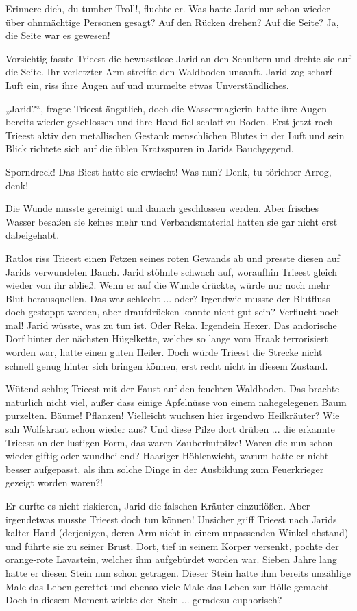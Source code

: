 Erinnere dich, du tumber Troll!, fluchte er. Was hatte Jarid nur schon wieder über ohnmächtige Personen gesagt? Auf den Rücken drehen? Auf die Seite? Ja, die Seite war es gewesen!

Vorsichtig fasste Trieest die bewusstlose Jarid an den Schultern und drehte sie auf die Seite. Ihr verletzter Arm streifte den Waldboden unsanft. Jarid zog scharf Luft ein, riss ihre Augen auf und murmelte etwas Unverständliches.

„Jarid?“, fragte Trieest ängstlich, doch die Wassermagierin hatte ihre Augen bereits wieder geschlossen und ihre Hand fiel schlaff zu Boden. Erst jetzt roch Trieest aktiv den metallischen Gestank menschlichen Blutes in der Luft und sein Blick richtete sich auf die üblen Kratzspuren in Jarids Bauchgegend.

Sporndreck! Das Biest hatte sie erwischt! Was nun? Denk, tu törichter Arrog, denk!

Die Wunde musste gereinigt und danach geschlossen werden. Aber frisches Wasser besaßen sie keines mehr und Verbandsmaterial hatten sie gar nicht erst dabeigehabt.

Ratlos riss Trieest einen Fetzen seines roten Gewands ab und presste diesen auf Jarids verwundeten Bauch. Jarid stöhnte schwach auf, woraufhin Trieest gleich wieder von ihr abließ. Wenn er auf die Wunde drückte, würde nur noch mehr Blut herausquellen. Das war schlecht ... oder? Irgendwie musste der Blutfluss doch gestoppt werden, aber draufdrücken konnte nicht gut sein? Verflucht noch mal! Jarid wüsste, was zu tun ist. Oder Reka. Irgendein Hexer. Das andorische Dorf hinter der nächsten Hügelkette, welches so lange vom Hraak terrorisiert worden war, hatte einen guten Heiler. Doch würde Trieest die Strecke nicht schnell genug hinter sich bringen können, erst recht nicht in diesem Zustand.

Wütend schlug Trieest mit der Faust auf den feuchten Waldboden. Das brachte natürlich nicht viel, außer dass einige Apfelnüsse von einem nahegelegenen Baum purzelten. Bäume! Pflanzen! Vielleicht wuchsen hier irgendwo Heilkräuter? Wie sah Wolfskraut schon wieder aus? Und diese Pilze dort drüben ... die erkannte Trieest an der lustigen Form, das waren Zauberhutpilze! Waren die nun schon wieder giftig oder wundheilend? Haariger Höhlenwicht, warum hatte er nicht besser aufgepasst, als ihm solche Dinge in der Ausbildung zum Feuerkrieger gezeigt worden waren?!

Er durfte es nicht riskieren, Jarid die falschen Kräuter einzuflößen. Aber irgendetwas musste Trieest doch tun können! Unsicher griff Trieest nach Jarids kalter Hand (derjenigen, deren Arm nicht in einem unpassenden Winkel abstand) und führte sie zu seiner Brust. Dort, tief in seinem Körper versenkt, pochte der orange-rote Lavastein, welcher ihm aufgebürdet worden war. Sieben Jahre lang hatte er diesen Stein nun schon getragen. Dieser Stein hatte ihm bereits unzählige Male das Leben gerettet und ebenso viele Male das Leben zur Hölle gemacht. Doch in diesem Moment wirkte der Stein ... geradezu euphorisch?


